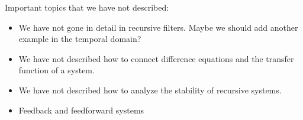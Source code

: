 Important topics that we have not described:
\begin{itemize}
	\item We have not gone in detail in recursive filters. Maybe we should add another example in the temporal domain?
	\item We have not described how to connect difference equations and the transfer function of a system.
	\item We have not described how to analyze the stability of recursive systems.
	\item Feedback and feedforward systems
\end{itemize}


%

